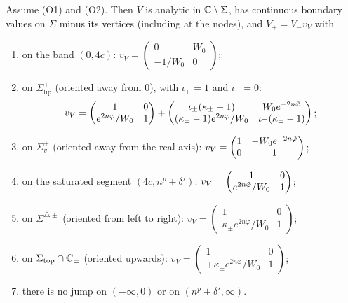 \begin{lemma}[Jumps of $V$]\label{lem:jumpsV}
Assume (O1) and (O2). Then $V$ is analytic in $\mathbb{C}\setminus\Sigma$, has continuous boundary values on $\Sigma$ minus its
vertices (including at the nodes), and $V_+=V_-v_V$ with
\begin{enumerate}
\item[(a)] on the band $(0,4c)$: $v_V=\begin{pmatrix}0&W_0\\-1/W_0&0\end{pmatrix}$;
\item[(b)] on $\Sigma^\pm_{\mathrm{lip}}$ (oriented away from $0$), with $\iota_+=1$ and $\iota_-=0$:
  \[
    v_V=\begin{pmatrix}1&0\\e^{2n\varphi}/W_0&1\end{pmatrix}
    +\begin{pmatrix}\iota_\pm(\kappa_\pm-1)&W_0e^{-2n\tilde\varphi}\\(\kappa_\pm-1)e^{2n\varphi}/W_0&\iota_\mp(\kappa_\pm-1)\end{pmatrix};
  \]
\item[(c)] on $\Sigma_v^\pm$ (oriented away from the real axis): $v_V=\begin{pmatrix}1&-W_0e^{-2n\tilde\varphi}\\0&1\end{pmatrix}$;
\item[(d)] on the saturated segment $(4c,n^p+\delta')$: $v_V=\begin{pmatrix}1&0\\e^{2n\tilde\varphi}/W_0&1\end{pmatrix}$;
\item[(e)] on $\Sigma^{\triangle\pm}$ (oriented from left to right): $v_V=\begin{pmatrix}1&0\\\kappa_\pm e^{2n\varphi}/W_0&1\end{pmatrix}$;
\item[(f)] on $\Sigma_{\mathrm{top}}\cap\mathbb{C}_\pm$ (oriented upwards): $v_V=\begin{pmatrix}1&0\\\mp\kappa_\pm e^{2n\varphi}/W_0&1\end{pmatrix}$;
\item[(g)] there is no jump on $(-\infty,0)$ or on $(n^p+\delta',\infty)$.
\end{enumerate}
\end{lemma}

